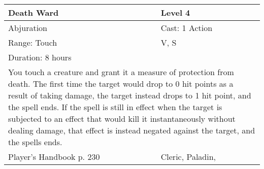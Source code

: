 \documentclass[11pt]{report}
\begin{document}
\begin{table}[H]
	\begin{tabular}{||p{6cm}|p{6cm}||}
		\hline\hline
		\bf{Death Ward} & Level 4\\ \hline
		Abjuration & Cast: 1 Action\\ \hline
		Range: Touch & V, S\\ \hline
		Duration: 8 hours & \\ \hline
		\multicolumn{2}{||p{12cm}||}{You touch a creature and grant it a measure of protection from death. 
The first time the target would drop to 0 hit points as a result of taking damage, the target instead drops to 1 hit point, and the spell ends. If the spell is still in effect when the target is subjected to an effect that would kill it instantaneously without dealing damage, that effect is instead negated against the target, and the spells ends.}\\ \hline
Player's Handbook p. 230 & Cleric, Paladin, \\ \hline\hline
	\end{tabular}
\end{table}
\end{document}
